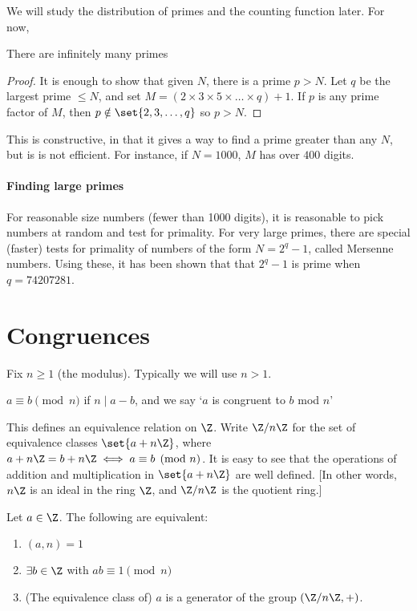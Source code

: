 \documentclass{article}
\begin{document}
We will study the distribution of primes and the counting function later.  For now,
\begin{thm}[Euclid]
    There are infinitely many primes
\end{thm}
\begin{proof}
    It is enough to show that given $N$, there is a prime $p > N$. Let $q$ be the largest prime $\leq N$, and set $M = (2 \times 3 \times 5 \times \dots \times q) + 1$. If $p$ is any prime factor of $M$, then $p \notin \set{2, 3, \dotsc, q}$ so $p > N$.
\end{proof}

\begin{remark}
    This is constructive, in that it gives a way to find a prime greater than any $N$, but is is not efficient. For instance, if $N=1000$, $M$ has over $400$ digits.
\end{remark}

\paragraph{Finding large primes} For reasonable size numbers (fewer than 1000 digits), it is reasonable to pick numbers at random and test for primality.
For very large primes, there are special (faster) tests for primality of numbers of the form $N = 2^q - 1$, called Mersenne numbers.
Using these, it has been shown that that $2^q - 1$ is prime when $q = 74207281$.

\clearpage

\section{Congruences}
Fix $n \geq 1$ (the modulus).  Typically we will use $n > 1$.
\begin{defi}
    $ a \equiv b \pmod{n}$ if $n \mid a-b$, and we say `$a$ is congruent to $b$ mod $n$'
\end{defi}

This defines an equivalence relation on $\Z$. Write $\Z / n\Z$ for the set of equivalence classes $\set{a + n \Z}$, where $a + n \Z = b + n \Z \iff a \equiv b \pmod{n}$.  It is easy to see that the operations of addition and multiplication in $\set{a + n \Z}$ are well defined.  [In other words, $n \Z$ is an ideal in the ring $\Z$, and $\Z / n\Z$ is the quotient ring.]

\begin{nlemma}\label{lem:2_1}
    Let $a \in \Z$. The following are equivalent:
    \begin{enumerate}[label=\roman*.]
        \item $(a, n) = 1$
        \item $\exists b \in \Z$ with $ab \equiv 1 \pmod{n}$
        \item (The equivalence class of) $a$ is a generator of the group $(\Z/n\Z, +)$.
    \end{enumerate}
\end{nlemma}
\end{document}

